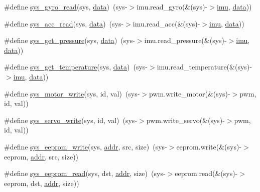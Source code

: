 \begin{DoxyCompactItemize}
\item 
\#define \hyperlink{group__syscalls_gaf2312049b5ee0defc282995f9e3fd0f2}{sys\+\_\+gyro\+\_\+read}(sys, \hyperlink{transponder_8h_a8bfd79faff98a8b652ff64958dec9a18}{data})~(sys-\/$>$imu.\+read\+\_\+gyro(\&(sys)-\/$>$\hyperlink{structimu}{imu}, \hyperlink{transponder_8h_a8bfd79faff98a8b652ff64958dec9a18}{data}))
\item 
\#define \hyperlink{group__syscalls_ga80d7e1474e8a4c1340a74853c006c7c2}{sys\+\_\+acc\+\_\+read}(sys, \hyperlink{transponder_8h_a8bfd79faff98a8b652ff64958dec9a18}{data})~(sys-\/$>$imu.\+read\+\_\+acc(\&(sys)-\/$>$\hyperlink{structimu}{imu}, \hyperlink{transponder_8h_a8bfd79faff98a8b652ff64958dec9a18}{data}))
\item 
\#define \hyperlink{group__syscalls_ga94588cff67864d374a09cc17f5b4f123}{sys\+\_\+get\+\_\+pressure}(sys, \hyperlink{transponder_8h_a8bfd79faff98a8b652ff64958dec9a18}{data})~(sys-\/$>$imu.\+read\+\_\+pressure(\&(sys)-\/$>$\hyperlink{structimu}{imu}, \hyperlink{transponder_8h_a8bfd79faff98a8b652ff64958dec9a18}{data}))
\item 
\#define \hyperlink{group__syscalls_ga36a4deb5328337807a0b518d42f25808}{sys\+\_\+get\+\_\+temperature}(sys, \hyperlink{transponder_8h_a8bfd79faff98a8b652ff64958dec9a18}{data})~(sys-\/$>$imu.\+read\+\_\+temperature(\&(sys)-\/$>$\hyperlink{structimu}{imu}, \hyperlink{transponder_8h_a8bfd79faff98a8b652ff64958dec9a18}{data}))
\item 
\#define \hyperlink{group__syscalls_ga946b93b1fd030a3c34bd62dbbb9ad540}{sys\+\_\+motor\+\_\+write}(sys, id, val)~(sys-\/$>$pwm.\+write\+\_\+motor(\&(sys)-\/$>$pwm, id, val))
\item 
\#define \hyperlink{group__syscalls_ga4caebec5f44bb3ae28a42e3fad101f37}{sys\+\_\+servo\+\_\+write}(sys, id, val)~(sys-\/$>$pwm.\+write\+\_\+servo(\&(sys)-\/$>$pwm, id, val))
\item 
\#define \hyperlink{group__syscalls_ga0bfcb802f7cca93c677ba32d180b2aa2}{sys\+\_\+eeprom\+\_\+write}(sys, \hyperlink{config_8c_a41a6aad09727eb120338c35535a652a6}{addr}, src, size)~(sys-\/$>$eeprom.\+write(\&(sys)-\/$>$eeprom, \hyperlink{config_8c_a41a6aad09727eb120338c35535a652a6}{addr}, src, size))
\item 
\#define \hyperlink{group__syscalls_ga6bc4d0120cc4965daa12aa09b6d7ff1e}{sys\+\_\+eeprom\+\_\+read}(sys, dst, \hyperlink{config_8c_a41a6aad09727eb120338c35535a652a6}{addr}, size)~(sys-\/$>$eeprom.\+read(\&(sys)-\/$>$eeprom, dst, \hyperlink{config_8c_a41a6aad09727eb120338c35535a652a6}{addr}, size))
\item 

\end{DoxyCompactItemize}
